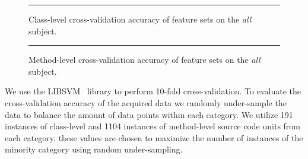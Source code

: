 \begin{figure}[!ht]
  \centering
  \begin{adjustbox}{max size={.95\textwidth}{.95\textheight}}
    
  \end{adjustbox}
  \caption{Class-level cross-validation accuracy of feature sets on the \emph{all} subject.}
  \vspace{2mm}
  \hrule
  \label{fig:all_cross_validation_features_class_graph}
\end{figure}

\begin{figure}[!ht]
  \centering
  \begin{adjustbox}{max size={.95\textwidth}{.95\textheight}}
    
  \end{adjustbox}
  \caption{Method-level cross-validation accuracy of feature sets on the \emph{all} subject.}
  \vspace{2mm}
  \hrule
  \label{fig:all_cross_validation_features_method_graph}
\end{figure}

We use the LIBSVM~\cite{CL11} library to perform 10-fold cross-validation. To evaluate the cross-validation accuracy of the acquired data we randomly under-sample the data to balance the amount of data points within each category. We utilize 191 instances of class-level and 1104 instances of method-level source code units from each category, these values are chosen to maximize the number of instances of the minority category using random under-sampling.

